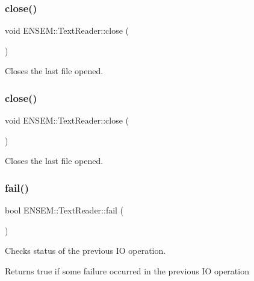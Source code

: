 \subsubsection{\texorpdfstring{close()}{close()}\hspace{0.1cm}{\footnotesize\ttfamily [2/3]}}
{\footnotesize\ttfamily void E\+N\+S\+E\+M\+::\+Text\+Reader\+::close (\begin{DoxyParamCaption}{ }\end{DoxyParamCaption})}



Closes the last file opened. 

\mbox{\label{classENSEM_1_1TextReader_a19f171518a1c7a06739d2d7de016f346}} 
\subsubsection{\texorpdfstring{close()}{close()}\hspace{0.1cm}{\footnotesize\ttfamily [3/3]}}
{\footnotesize\ttfamily void E\+N\+S\+E\+M\+::\+Text\+Reader\+::close (\begin{DoxyParamCaption}{ }\end{DoxyParamCaption})}



Closes the last file opened. 

\mbox{\label{classENSEM_1_1TextReader_ae21c25d2a62a1b242b09d745a314af69}} 
\subsubsection{\texorpdfstring{fail()}{fail()}\hspace{0.1cm}{\footnotesize\ttfamily [1/3]}}
{\footnotesize\ttfamily bool E\+N\+S\+E\+M\+::\+Text\+Reader\+::fail (\begin{DoxyParamCaption}{ }\end{DoxyParamCaption})}



Checks status of the previous IO operation. 

\begin{DoxyReturn}{Returns}
true if some failure occurred in the previous IO operation 
\end{DoxyReturn}
\mbox{\label{classENSEM_1_1TextReader_ae21c25d2a62a1b242b09d745a314af69}} 
